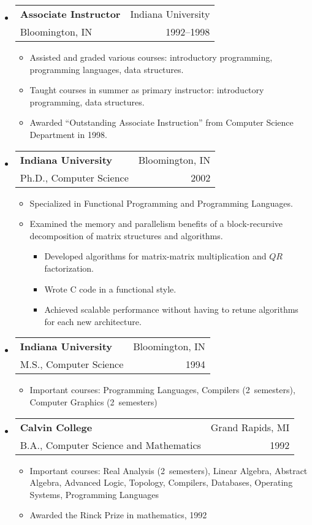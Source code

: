 \documentclass[letterpaper,11pt]{article}
\makeatletter
\newcommand{\resitem}[1]{\item #1 \vspace{-2pt}}
\newcommand{\resheading}[1]{{\large \parashade[.9]{sharpcorners}{\textbf{#1 \vphantom{p\^{E}}}}}}
\newcommand{\ressubheading}[4]{ 
\begin{tabular*}{6.5in}{l@{\extracolsep{\fill}}r}
	\textbf{#1} & #2 \\
	{#3} & {#4} \\
\end{tabular*}
\vspace{-6pt}}
\makeatother
\begin{document}
\begin{itemize}
	\item \ressubheading{Associate Instructor}{Indiana University}{Bloomington, IN}{1992--1998} 
	\begin{itemize}
		\resitem{Assisted and graded various courses: introductory programming, programming languages, data structures.}
		\resitem{Taught courses in summer as primary instructor: introductory programming, data structures.}
		\resitem{Awarded ``Outstanding Associate Instruction'' from Computer Science Department in 1998.}
	\end{itemize}
\end{itemize}


\resheading{Education} 
\begin{itemize}
	\item \ressubheading{Indiana University}{Bloomington, IN}{Ph.D., Computer Science}{2002} 
	\begin{itemize}
		\resitem{Specialized in Functional Programming and Programming Languages.}
		\resitem{Examined the memory and parallelism benefits of a block-recursive decomposition of matrix structures and algorithms.}
		  \begin{itemize}
			\item Developed algorithms for matrix-matrix multiplication and $QR$ factorization.
		  \item Wrote C code in a functional style.
		  \item Achieved scalable performance without having to retune algorithms for each new architecture.
		  \end{itemize}
	\end{itemize}
	
	\item \ressubheading{Indiana University}{Bloomington, IN}{M.S., Computer Science}{1994}	
	   \begin{itemize}
	   \resitem{Important courses: Programming Languages, Compilers (2~semesters), Computer Graphics (2~semesters)}
	   \end{itemize}
	
	\item \ressubheading{Calvin College}{Grand Rapids, MI}{B.A., Computer Science and Mathematics}{1992} 
  	\begin{itemize}
	  \resitem{Important courses: Real Analysis (2~semesters), Linear Algebra, Abstract Algebra, Advanced Logic, Topology, Compilers, Databases, Operating Systems, Programming Languages}
		\resitem{Awarded the Rinck Prize in mathematics, 1992} 
	  \end{itemize}
\end{itemize}
\end{document}
